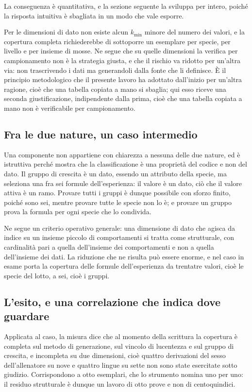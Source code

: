 La conseguenza è quantitativa, e la sezione seguente la sviluppa per intero, poiché la risposta intuitiva è sbagliata in un modo che vale esporre.

Per le dimensioni di dato non esiste alcun $k_{\min}$ minore del numero dei valori, e la copertura completa richiederebbe di sottoporre un esemplare per specie, per livello e per insieme di mosse. Ne segue che su quelle dimensioni la verifica per campionamento non è la strategia giusta, e che il rischio va ridotto per un'altra via: non trascrivendo i dati ma generandoli dalla fonte che li definisce. È il principio metodologico che il presente lavoro ha adottato dall'inizio per un'altra ragione, cioè che una tabella copiata a mano si sbaglia; qui esso riceve una seconda giustificazione, indipendente dalla prima, cioè che una tabella copiata a mano non è verificabile per campionamento.

\subsection*{Fra le due nature, un caso intermedio}

Una componente non appartiene con chiarezza a nessuna delle due nature, ed è istruttiva perché mostra che la classificazione è una proprietà del codice e non del dato. Il gruppo di crescita è un dato, essendo un attributo della specie, ma seleziona una fra sei formule dell'esperienza: il valore è un dato, ciò che il valore attiva è un ramo. Provare tutti i gruppi è dunque possibile con sforzo finito, poiché sono sei, mentre provare tutte le specie non lo è; e provare un gruppo prova la formula per ogni specie che lo condivida.

Ne segue un criterio operativo generale: una dimensione di dato che agisca da indice su un insieme piccolo di comportamenti si tratta come strutturale, con cardinalità pari a quella dell'insieme dei comportamenti e non a quella dell'insieme dei dati. La riduzione che ne risulta può essere enorme, e nel caso in esame porta la copertura delle formule dell'esperienza da trentatre valori, cioè le specie del lotto, a sei, cioè i gruppi.

\subsection*{L'esito, e una correlazione che indica dove guardare}

Applicata al caso, la misura dice che al momento della scrittura la copertura è completa sul metodo di generazione, sul vincolo di lucentezza e sul gruppo di crescita, e incompleta su due dimensioni, cioè quattro derivazioni del sesso dell'allenatore su nove e quattro lingue su sette non sono state esercitate sotto giudizio. Corrispondono a otto esemplari, che lo strumento nomina uno per uno: il residuo strutturale è dunque un lavoro di otto prove e non di centoquindici.

